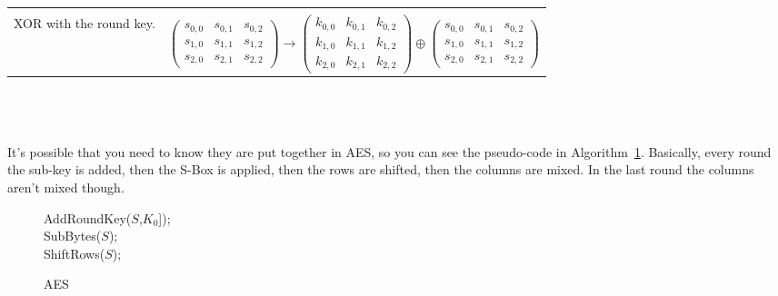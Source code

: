 \begin{tabular}{ll}
        \begin{minipage}[t]{\leftminipagewidth}
            \textbf{Round Key Addition}\\
            XOR with the round key.
        \end{minipage}
        &
        \begin{minipage}[t]{\rightminipagewidth}
        $
            \begin{pmatrix}
                s_{0,0} & s_{0,1} & s_{0,2}\\
                s_{1,0} & s_{1,1} & s_{1,2}\\
                s_{2,0} & s_{2,1} & s_{2,2}
            \end{pmatrix}
            \rightarrow
            \begin{pmatrix}
                k_{0,0} & k_{0,1} & k_{0,2}\\
                k_{1,0} & k_{1,1} & k_{1,2}\\
                k_{2,0} & k_{2,1} & k_{2,2}
            \end{pmatrix}
            \oplus
            \begin{pmatrix}
                s_{0,0} & s_{0,1} & s_{0,2}\\
                s_{1,0} & s_{1,1} & s_{1,2}\\
                s_{2,0} & s_{2,1} & s_{2,2}
            \end{pmatrix}
        $
        \end{minipage}

    \end{tabular}\\\\
    \\
    It's possible that you need to know they are put together in AES, so you can see the pseudo-code in Algorithm~\ref{alg:aes}. Basically, every round the sub-key is added, then the S-Box is applied, then the rows are shifted, then the columns are mixed. In the last round the columns aren't mixed though.\\
    \begin{figure}[htp!]
        \centering
        \begin{algorithm}[H]
            \SetAlgoLined
            AddRoundKey($S$,$K_0$]);\\
            SubBytes($S$);\\
            ShiftRows($S$);\\
            \caption{AES}
            \label{alg:aes}
        \end{algorithm}
    \end{figure}
